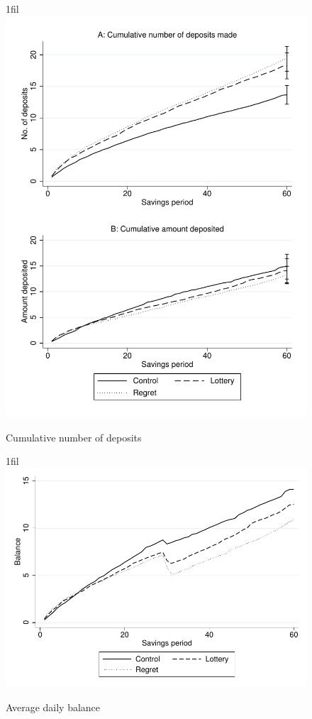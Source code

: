 \documentclass[10pt]{article}
\makeatletter
\newcommand*{\centerfloat}{%
  \parindent \z@
  \leftskip \z@ \@plus 1fil \@minus \textwidth
  \rightskip\leftskip
  \parfillskip \z@skip}
\makeatother
\begin{document}
		\begin{figure}[h]
		\centering
		\caption{Cumulative number of deposits}
		\centerfloat
		\includegraphics[width=\textwidth]{../../figures/line-cumdeposits.pdf}
		\end{figure}

		\begin{figure}[h]
		\centering
		\caption{Average daily balance}
		\centerfloat
		\includegraphics[width=\textwidth]{../../figures/line-balance.pdf}
		\end{figure}
\end{document}
